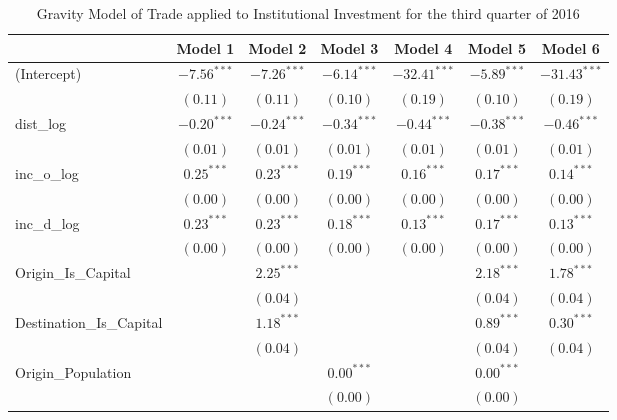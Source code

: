 \begin{table}
	\begin{center}
		\small
		\caption[Gravity Model of trade for Q3 2016]{Gravity Model of Trade applied to Institutional Investment for the third quarter of 2016}
		\begin{tabular}{l c c c c c c }
			\hline
			& Model 1 & Model 2 & Model 3 & Model 4 & Model 5 & Model 6 \\
			\hline
			(Intercept)                  & $-7.56^{***}$ & $-7.26^{***}$ & $-6.14^{***}$ & $-32.41^{***}$ & $-5.89^{***}$ & $-31.43^{***}$ \\
			& $(0.11)$      & $(0.11)$      & $(0.10)$      & $(0.19)$       & $(0.10)$      & $(0.19)$       \\
			dist\_log                    & $-0.20^{***}$ & $-0.24^{***}$ & $-0.34^{***}$ & $-0.44^{***}$  & $-0.38^{***}$ & $-0.46^{***}$  \\
			& $(0.01)$      & $(0.01)$      & $(0.01)$      & $(0.01)$       & $(0.01)$      & $(0.01)$       \\
			inc\_o\_log                  & $0.25^{***}$  & $0.23^{***}$  & $0.19^{***}$  & $0.16^{***}$   & $0.17^{***}$  & $0.14^{***}$   \\
			& $(0.00)$      & $(0.00)$      & $(0.00)$      & $(0.00)$       & $(0.00)$      & $(0.00)$       \\
			inc\_d\_log                  & $0.23^{***}$  & $0.23^{***}$  & $0.18^{***}$  & $0.13^{***}$   & $0.17^{***}$  & $0.13^{***}$   \\
			& $(0.00)$      & $(0.00)$      & $(0.00)$      & $(0.00)$       & $(0.00)$      & $(0.00)$       \\
			Origin\_Is\_Capital          &               & $2.25^{***}$  &               &                & $2.18^{***}$  & $1.78^{***}$   \\
			&               & $(0.04)$      &               &                & $(0.04)$      & $(0.04)$       \\
			Destination\_Is\_Capital     &               & $1.18^{***}$  &               &                & $0.89^{***}$  & $0.30^{***}$   \\
			&               & $(0.04)$      &               &                & $(0.04)$      & $(0.04)$       \\
			Origin\_Population           &               &               & $0.00^{***}$  &                & $0.00^{***}$  &                \\
			&               &               & $(0.00)$      &                & $(0.00)$      &                \\

\end{tabular}
\end{center}
\end{table}
